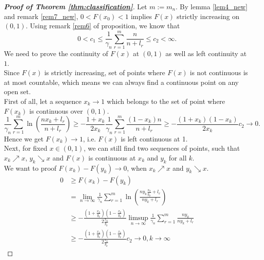 \documentclass[12pt]{article}
\theoremstyle{plain}
\theoremstyle{definition}
\theoremstyle{remark}
\begin{document}
\begin{proof}[\textit{\textbf{Proof of Theorem \ref{thm:classification}}}]
    Let $m:=m_n$. By lemma \ref{lem4_new} and remark \ref{rem7_new}, $0<F(x_0)<1$ implies $F(x)$ strictly increasing on $(0,1)$. Using remark \ref{rem6} of proposition, we know that
    \begin{equation*}
    0<c_1\leq \frac{1}{\gamma_{n}} \sum_{r=1}^{m} \frac{n}{n+l_{r}} %
    \leq c_2<\infty.
    \end{equation*}
     We need to prove the continuity of $F(x)$ at $(0,1)$ as well as left continuity at $1$.\\
     Since $F(x)$ is strictly increasing, set of points where $F(x)$ is not continuous is at most countable, which means we can always find a continuous point on any open set.\\
First of all, let a sequence $x_k\to 1$ which belongs to the set of point where $F(x_k)$ is continuous over $(0,1)$.
\begin{equation*}
 \frac{1}{\gamma_{n}} \sum_{r=1}^{m} \ln \left(\frac{n x_k+l_{r}}{n+l_{r}}\right)\geq -\frac{1+x_k}{2 x_k} \frac{1}{\gamma_{n}} \sum_{r=1}^{m} \frac{(1-x_k) n}{n+l_{r}} \geq -\frac{(1+x_k)(1-x_k)}{2x_k}c_2\to 0.
\end{equation*}
Hence we get $F(x_k)\to 1$, i.e. $F(x)$ is left continuous at 1.\\
Next, for fixed $x\in (0,1)$, we can still find two sequences of points, such that $x_k\nearrow x$, $y_k\searrow x$ and $F(x)$ is continuous at $x_k$ and $y_k$ for all $k$.\\
We want to proof $F(x_k)-F(y_k)\to 0$, when $x_k\nearrow x$ and $y_k\searrow x$.
\begin{align*}
    0&\geq F(x_k)-F(y_k)\\
  &= \lim _{n \rightarrow \infty} \frac{1}{\gamma_{n}} \sum_{r=1}^{m} \ln \left(\frac{n y_{k} \frac{x_{k}}{y_{k}}+l_{r}}{n y_{k}+l_{r}}\right)\\
  &\geq   -\frac{(1+\frac{x_{k}}{y_{k}})(1-\frac{x_{k}}{y_{k}})}{2 \frac{x_{k}}{y_{k}}} \limsup _{n \rightarrow \infty} \frac{1}{\gamma_{n}} \sum_{r=1}^{m} \frac{ ny_k}{ny_k+l_{r}}\\ &\geq-\frac{\left(1+\frac{x_{k}}{y_{k}}\right)\left(1-\frac{x_{k}}{y_{k}}\right)}{2 \frac{x_{k}}{y_{k}}} c_2\to 0, k\to  \infty
\end{align*}


\end{proof}
\end{document}
